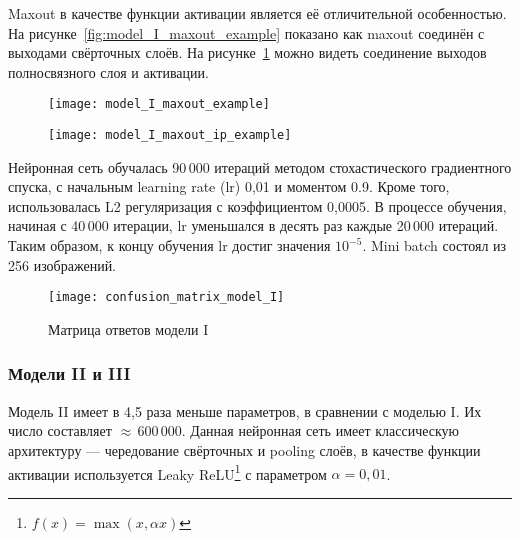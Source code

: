 Maxout в качестве функции активации является её отличительной особенностью.
На рисунке~\ref{fig:model_I_maxout_example} показано как maxout соединён с выходами свёрточных слоёв. На
рисунке~\ref{fig:model_I_maxout_ip_example} можно видеть соединение выходов полносвязного слоя и активации.

\begin{figure}[H]
\centering
\begin{minipage}{.5\textwidth}
  \centering
  \texttt{[image: model\_I\_maxout\_example]}
  \label{fig:model_I_maxout_example}
\end{minipage}%
\begin{minipage}{.5\textwidth}
  \centering
  \texttt{[image: model\_I\_maxout\_ip\_example]}
  \label{fig:model_I_maxout_ip_example}
  \vspace*{1.4cm}
\end{minipage}
\vspace*{-1.4cm}
\end{figure}

Нейронная сеть обучалась 90\,000 итераций методом стохастического градиентного спуска,
с начальным learning rate (lr) 0,01 и моментом 0.9. Кроме того, использовалась L2 регуляризация с коэффициентом 0,0005.
В процессе обучения, начиная с 40\,000 итерации, lr уменьшался в десять раз каждые 20\,000 итераций.
Таким образом, к концу обучения lr достиг значения $10^{-5}$. Mini batch состоял из 256 изображений.

\begin{figure}[H]
    \centering
    \texttt{[image: confusion\_matrix\_model\_I]}
    \vspace*{-0.5cm}
    \caption{Матрица ответов модели I}
    \label{fig:confusion_matrix_model_I}
\end{figure}

\subsubsection{Модели II и III}
Модель II имеет в 4,5 раза меньше параметров, в сравнении с моделью I. Их число составляет $\approx$\,600\,000.
Данная нейронная сеть имеет классическую архитектуру --- чередование свёрточных и pooling слоёв, в качестве
функции активации используется Leaky ReLU\footnote{$f(x) = \max(x, \alpha x)$} с параметром $\alpha = 0,01$.

